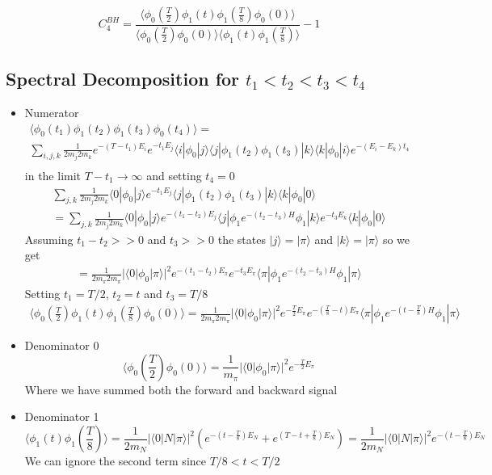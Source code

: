 \documentclass[10pt,a4paper]{article}
\begin{document}
$$C_4^{BH}=\frac{\langle \phi_0(\frac{T}{2})\phi_1(t)\phi_1(\frac{T}{8}) \phi_0(0)\rangle}
{\langle \phi_0(\frac{T}{2}) \phi_0(0)\rangle \langle \phi_1(t)\phi_1(\frac{T}{8}) \rangle} -1
$$

\subsection{Spectral Decomposition for $t_1<t_2<t_3<t_4$}

\begin{itemize}

\item Numerator
\begin{gather}
\langle \phi_0(t_1)\phi_1(t_2)\phi_1(t_3) \phi_0(t_4)\rangle=\\
 \sum_{i,j,k}\frac{1}{ 2 m_j 2 m_k}e^{-(T-t_1)E_i} e^{-t_1E_j}\langle i| \phi_0 | j\rangle\langle j|  \phi_1(t_2)\phi_1(t_3) 
 | k\rangle\langle k|  \phi_0 |i\rangle e^{-(E_i-E_k)t_4}\\
\end{gather}
in the limit $T-t_1\to \infty$ and setting $t_4=0$
\begin{gather}
 \sum_{j,k}\frac{1}{ 2 m_j 2 m_k}\langle 0| \phi_0 | j\rangle  e^{-t_1E_j} \langle j|   \phi_1(t_2)\phi_1(t_3) 
 | k\rangle  \langle k| \phi_0 | 0\rangle  \\
 = \sum_{j,k}\frac{1}{ 2 m_j 2 m_k}\langle 0| \phi_0 | j\rangle  e^{-(t_1-t_2)E_j} \langle j|   \phi_1 e^{-(t_2-t_3)H}\phi_1 
 | k\rangle  e^{- t_3 E_k} \langle k| \phi_0 | 0\rangle
\end{gather}
Assuming $t_1-t_2>>0$ and $t_3>>0$ the states $|j\rangle =| \pi\rangle$ and 
$|k\rangle =| \pi\rangle$ so we get
\begin{gather}
=\frac{1}{ 2 m_\pi 2 m_\pi}|\langle 0| \phi_0 | \pi\rangle|^2  e^{-(t_1-t_2)E_{\pi}}e^{- t_3 E_\pi}  \langle \pi|   \phi_1 e^{-(t_2-t_3)H}\phi_1 
 | \pi\rangle  
\end{gather}
Setting  $t_1=T/2$, $t_2=t$ and $t_3=T/8$
\begin{gather}
\langle \phi_0(\frac{T}{2})\phi_1(t)\phi_1(\frac{T}{8}) \phi_0(0)\rangle=
\frac{1}{ 2 m_\pi 2 m_\pi}|\langle 0| \phi_0 | \pi\rangle|^2  e^{-\frac{T}{2}E_{\pi}}e^{- (\frac{T}{8}-t) E_\pi}  \langle \pi|   \phi_1 e^{-(t-\frac{T}{8})H}\phi_1 
 | \pi\rangle  
\end{gather}

 \item Denominator 0
$$
\langle \phi_0(\frac{T}{2}) \phi_0(0)\rangle = \frac{1}{m_\pi}|\langle 0| \phi_0 | \pi\rangle|^2  e^{-\frac{T}{2}E_\pi}
$$
Where we have summed both the forward and backward signal

 \item Denominator 1
$$
\langle \phi_1(t) \phi_1(\frac{T}{8})\rangle = \frac{1}{2m_N}|\langle 0| N | \pi\rangle|^2  \left(e^{- (t-\frac{T}{8})E_N}+  e^{(T-t+\frac{T}{8})E_N}  \right)
=\frac{1}{2m_N}|\langle 0| N | \pi\rangle|^2  e^{- (t-\frac{T}{8})E_N}
$$
We can ignore the second term since $T/8<t<T/2$

\end{itemize}
\end{document}
